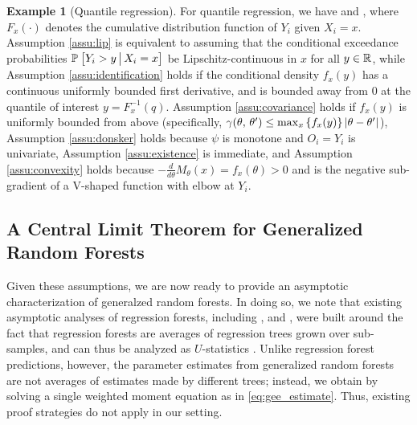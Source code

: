 \documentclass[aos]{imsart}
\theoremstyle{plain}
\theoremstyle{definition}
\newtheorem{exam}{Example}
\theoremstyle{remark}
\begin{document}
\begin{CJK}{UTF8}{gbsn}
{\begin{exam}[Quantile regression]
For quantile regression, we have
and ,
where $F_x(\cdot)$ denotes the cumulative distribution function of $Y_i$ given $X_i = x$.
Assumption \ref{assu:lip} is equivalent to assuming that the
conditional exceedance probabilities $\mathbb{P}_{}\left[Y_i > y \,\big|\, X_i = x\right]$
be Lipschitz-continuous in $x$ for all $y \in \mathbb{R}$, while Assumption \ref{assu:identification}
holds if the conditional density $f_x(y)$ has a continuous uniformly bounded first derivative,
and is bounded away from 0 at the quantile of interest $y = F^{-1}_x(q)$.
Assumption \ref{assu:covariance} holds if $f_x(y)$ is uniformly bounded from above
(specifically, $\gamma(\theta, \, \theta') \leq \max_x \left\{f_x(y)\right\} \left\lvert\theta - \theta'\right\rvert$),
Assumption \ref{assu:donsker} holds because $\psi$ is monotone and $O_i = Y_i$ is univariate,
Assumption \ref{assu:existence} is immediate, and Assumption \ref{assu:convexity} holds
because $ - \frac{d}{d\theta} M_\theta(x) = f_x(\theta) > 0$ and 
is the negative sub-gradient of a V-shaped function with elbow at $Y_i$.
\end{exam}

\subsection{A Central Limit Theorem for Generalized Random Forests}
\label{sec:gauss}

Given these assumptions, we are now ready to provide an asymptotic characterization
of generalzed random forests. In doing so, we note that existing asymptotic analyses of regression forests,
including \citet{mentch2016quantifying}, \citet{scornet2015consistency} and \citet{wager2015estimation},
were built around the fact that regression forests are averages of regression
trees grown over sub-samples, and can thus be analyzed as $U$-statistics \citep{hoeffding1948class}.
Unlike regression forest predictions, however, the parameter estimates 
from generalized random forests are not averages of estimates made by different trees;
instead, we obtain  by solving a single weighted moment equation
as in \eqref{eq:gee_estimate}. Thus, existing proof strategies do not apply in our setting.

}
\end{CJK}
\end{document}
